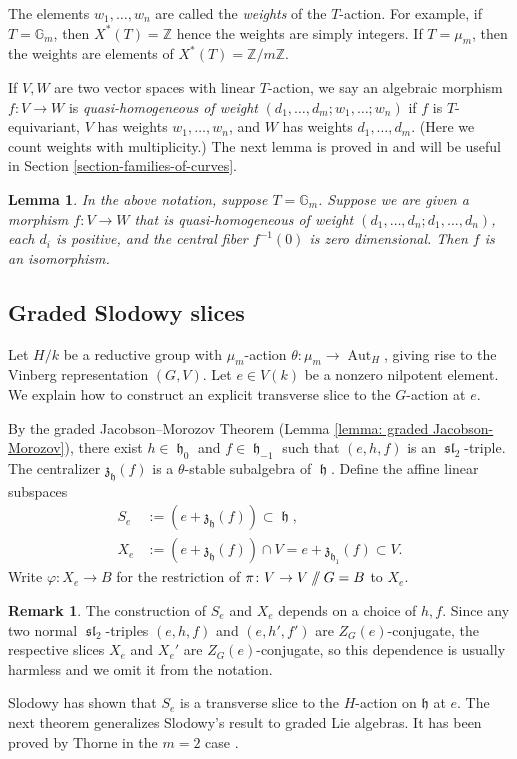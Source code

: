 \documentclass{article} %
\newtheorem{lemma}[proposition]{Lemma}
\numberwithin{equation}{section}
\theoremstyle{definition}
\newtheorem{remark}[proposition]{Remark}
\newcommand{\G}{\mathbb{G}}
\DeclareMathOperator{\liesl}{\mathfrak{sl}}
\DeclareMathOperator{\lieh}{\mathfrak{h}}
\DeclareMathOperator{\Aut}{Aut}
\newcommand{\GIT}{\mathbin{/\mkern-6mu/}}
\newcommand{\Z}{\mathbb{Z}}
\newcommand{\frakh}{\mathfrak h}
\newcommand{\frakz}{\mathfrak z}
\begin{document}
The elements $w_1, \dots, w_n$ are called the \textit{weights} of the $T$-action.
For example, if $T = \G_m$, then $X^*(T) = \Z$ hence the weights are simply integers.
If $T = \mu_m$, then the weights are elements of $X^*(T) = \Z/m\Z$.


If $V,W$ are two vector spaces with linear $T$-action, we say an algebraic morphism $f\colon V\rightarrow W$ is \emph{quasi-homogeneous of weight} $(d_1,\dots,d_m; w_1 ,\dots ; w_n)$ if $f$ is $T$-equivariant, $V$ has weights $w_1,\dots,w_n$, and $W$ has weights $d_1,\dots,d_m$. (Here we count weights with multiplicity.)
The next lemma is proved in \cite[Section 8.1, Lemma 3]{Slodowy-simplesingularitiesalggroups} and will be useful in Section \ref{section-families-of-curves}.

\begin{lemma}\label{lemma: Gm-morphism same positive weights is isomorphism}
    In the above notation, suppose $T = \G_m$. Suppose we are given a morphism $f\colon V\rightarrow W$ that is quasi-homogeneous of weight $(d_1, \dots, d_n ; d_1, \dots, d_n)$, each $d_i$ is positive, and the central fiber $f^{-1}(0)$ is zero dimensional.
    Then $f$ is an isomorphism.
\end{lemma}


\subsection{Graded Slodowy slices}\label{subsec: graded Slodowy slices}

Let $H/k$ be a reductive group with $\mu_m$-action $\theta\colon \mu_m \rightarrow \Aut_H$, giving rise to the Vinberg representation $(G,V)$.
Let $e\in V(k)$ be a nonzero nilpotent element. 
We explain how to construct an explicit transverse slice to the $G$-action at $e$.

By the graded Jacobson--Morozov Theorem (Lemma \ref{lemma: graded Jacobson-Morozov}), there exist $h\in \lieh_0$ and $f\in \lieh_{-1}$ such that $(e,h,f)$ is an $\liesl_2$-triple.
The centralizer $\frakz_{\lieh}(f)$ is a $\theta$-stable subalgebra of $\lieh$.
Define the affine linear subspaces
\begin{align}\label{equation: transverse slodowy slices}
    S_e &:= (e + \frakz_{\lieh}(f))  \subset \lieh, \\
    X_e &:= (e + \frakz_{\lieh}(f)) \cap V = e +\frakz_{\frakh_1}(f) \subset V.
\end{align}
Write $\varphi\colon X_e\rightarrow B$ for the restriction of $\pi \colon V \rightarrow V \GIT G = B$ to $X_e$.
\begin{remark}
    The construction of $S_e$ and $X_e$ depends on a choice of $h,f$. Since any two normal $\liesl_2$-triples $(e,h,f)$ and $(e,h',f')$ are $Z_G(e)$-conjugate, the respective slices $X_e$ and $X_e'$ are $Z_G(e)$-conjugate, so this dependence is usually harmless and we omit it from the notation.
\end{remark}
Slodowy has shown that $S_e$ is a transverse slice to the $H$-action on $\frakh$ at $e$.
The next theorem generalizes Slodowy's result to graded Lie algebras.
It has been proved by Thorne in the $m=2$ case \cite[Proposition 3.4]{Thorne-thesis}.
\end{document}
